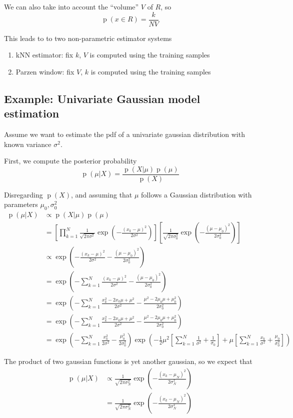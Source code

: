 \documentclass[oneside,onecolumn]{report}
\DeclareMathOperator*{\pdf}{p}
\begin{document}
We can also take into account the ``volume'' $V$ of $R$, so
$$ \pdf(x \in R) = \frac{k}{N V} $$

This leads to to two non-parametric estimator systems
\begin{enumerate}
    \item kNN estimator: fix $k$, $V$ is computed using the training samples
    \item Parzen window: fix $V$, $k$ is computed using the training samples
\end{enumerate}

\subsection{Example: Univariate Gaussian model estimation}
Assume we want to estimate the pdf of a univariate gaussian distribution with known variance $\sigma^2$.

First, we compute the posterior probability
$$ \pdf(\mu | X) = \frac{\pdf(X | \mu) \pdf(\mu)}{\pdf(X)} $$

Disregarding $\pdf(X)$, and assuming that $\mu$ follows a Gaussian distribution with parameters $\mu_0, \sigma_0^2$
\begin{align*}
\pdf(\mu | X)
& \propto \pdf(X | \mu) \pdf(\mu) \\
&= \left[ \prod_{k = 1}^N \frac{1}{\sqrt{2 \pi \sigma^2}} \exp( - \frac{(x_k - \mu)^2}{2 \sigma^2}) \right]
\left[ \frac{1}{\sqrt{2 \pi \sigma_0^2}} \exp( - \frac{(\mu - \mu_0)^2}{2 \sigma_0^2}) \right] \\
&\propto \exp( - \frac{(x_k - \mu)^2}{2 \sigma^2} - \frac{(\mu - \mu_0)^2}{2 \sigma_0^2}) \\
&= \exp( - \sum_{k = 1}^N \frac{(x_k - \mu)^2}{2 \sigma^2} - \frac{(\mu - \mu_0)^2}{2 \sigma_0^2}) \\
&= \exp( - \sum_{k = 1}^N \frac{x_k^2 - 2 x_k \mu + \mu^2}{2 \sigma^2} - \frac{\mu^2 - 2 \mu_0 \mu + \mu_0^2}{2 \sigma_0^2}) \\
&= \exp( - \sum_{k = 1}^N \frac{x_k^2 - 2 x_k \mu + \mu^2}{2 \sigma^2} - \frac{\mu^2 - 2 \mu_0 \mu + \mu_0^2}{2 \sigma_0^2}) \\
&= \exp( - \sum_{k = 1}^N \frac{x_k^2}{2 \sigma^2} - \frac{\mu_0^2}{2 \sigma_0^2})
\exp(
- \frac{1}{2} \mu^2 \left[ \sum_{k = 1}^N \frac{1}{\sigma^2} + \frac{1}{\sigma_0} \right]
+ \mu \left[ \sum_{k = 1}^N \frac{x_k}{\sigma^2} + \frac{\mu_0}{\sigma_0^2} \right])
\end{align*}

The product of two gaussian functions is yet another gaussian, so we expect that
\begin{align*}
\pdf(\mu | X)
&\propto \frac{1}{\sqrt{2 \pi \sigma_N^2}} \exp( - \frac{(x_k - \mu_N)^2}{2 \sigma_N^2}) \\
&= \frac{1}{\sqrt{2 \pi \sigma_N^2}} \exp( - \frac{(x_k - \mu_N)^2}{2 \sigma_N^2})
\end{align*}
\end{document}
